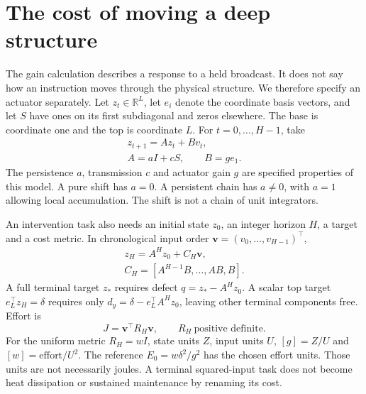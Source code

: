 \section{The cost of moving a deep structure}
\label{hrec:sec:actuation}
The gain calculation describes a response to a held broadcast. It does not say how an instruction moves through the physical structure. We therefore specify an actuator separately. Let \(z_t\in\mathbb R^L\), let \(e_i\) denote the coordinate basis vectors, and let \(S\) have ones on its first subdiagonal and zeros elsewhere. The base is coordinate one and the top is coordinate \(L\). For \(t=0,\ldots,H-1\), take
\begin{equation}
 \begin{gathered}
 z_{t+1}=A z_t+B v_t,\\
 A=aI+cS,\qquad B=g e_1.
 \end{gathered}
 \label{hrec:eq:chain}
\end{equation}
The persistence \(a\), transmission \(c\) and actuator gain \(g\) are specified properties of this model. A pure shift has \(a=0\). A persistent chain has \(a\ne0\), with \(a=1\) allowing local accumulation. The shift is not a chain of unit integrators.

An intervention task also needs an initial state \(z_0\), an integer horizon \(H\), a target and a cost metric. In chronological input order \(\bm v=(v_0,\ldots,v_{H-1})^\top\),
\begin{equation}
 \begin{gathered}
 z_H=A^H z_0+C_H\bm v,\\
 C_H=[A^{H-1}B,\ldots,AB,B].
 \end{gathered}
 \label{hrec:eq:chronological}
\end{equation}
A full terminal target \(z_*\) requires defect \(q=z_*-A^Hz_0\). A scalar top target \(e_L^\top z_H=\delta\) requires only
\(d_y=\delta-e_L^\top A^Hz_0\), leaving other terminal components free. Effort is
\begin{equation}
 J=\bm v^\top R_H\bm v,\qquad R_H\ \text{positive definite}.
 \label{hrec:eq:effort}
\end{equation}
For the uniform metric \(R_H=wI\), state units \(Z\), input units \(U\), \([g]=Z/U\) and \([w]=\text{effort}/U^2\). The reference \(E_0=w\delta^2/g^2\) has the chosen effort units. Those units are not necessarily joules. A terminal squared-input task does not become heat dissipation or sustained maintenance by renaming its cost.

